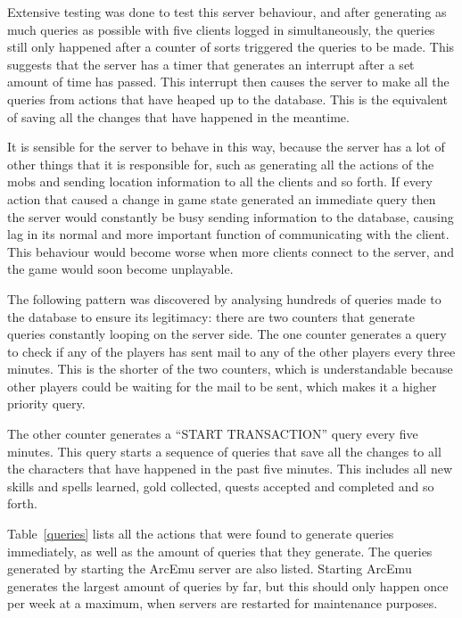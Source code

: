 Extensive testing was done to test this server behaviour, and after generating as much queries as possible with five clients logged in simultaneously, the queries still only happened after a counter of sorts triggered the queries to be made. This suggests that the server has a timer that generates an interrupt after a set amount of time has passed. This interrupt then causes the server to make all the queries from actions that have heaped up to the database. This is the equivalent of saving all the changes that have happened in the meantime.

It is sensible for the server to behave in this way, because the server has a lot of other things that it is responsible for, such as generating all the actions of the mobs and sending location information to all the clients and so forth. If every action that caused a change in game state generated an immediate query then the server would constantly be busy sending information to the database, causing lag in its normal and more important function of communicating with the client. This behaviour would become worse when more clients connect to the server, and the game would soon become unplayable. 

The following pattern was discovered by analysing hundreds of queries made to the database to ensure its legitimacy: there are two counters that generate queries constantly looping on the server side. The one counter generates a query to check if any of the players has sent mail to any of the other players every three minutes. This is the shorter of the two counters, which is understandable because other players could be waiting for the mail to be sent, which makes it a higher priority query.

The other counter generates a ``START TRANSACTION'' query every five minutes. This query starts a sequence of queries that save all the changes to all the characters that have happened in the past five minutes. This includes all new skills and spells learned, gold collected, quests accepted and completed and so forth. 

Table~\ref{queries} lists all the actions that were found to generate queries immediately, as well as the amount of queries that they generate. The queries generated by starting the ArcEmu server are also listed. Starting ArcEmu generates the largest amount of queries by far, but this should only happen once per week at a maximum, when servers are restarted for maintenance purposes.


